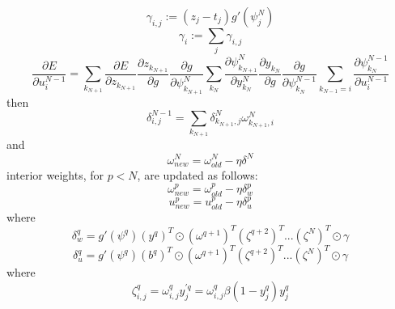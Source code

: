\documentclass{article}
\begin{document}
%
\begin{equation} \label{eq:gamma}
\gamma_{i,j} := (z_j - t_j) g'(\psi_j^N)
\end{equation}
%
\begin{equation} \label{eq:gamma_array}
\gamma_i := \sum_j \gamma_{i,j}
\end{equation}
%
\begin{equation} \label{eq:derive_du_nm1}
\frac{\partial E}{\partial u_i^{N-1}} =
\sum_{k_{N+1}} \frac{\partial E}{\partial z_{k_{N+1}}} \frac{\partial z_{k_{N+1}}}{\partial g} \frac{\partial g}{\partial \psi_{k_{N+1}}^N} \sum_{k_N} \frac{\partial \psi_{k_{N+1}}^N}{\partial y_{k_N}^N} \frac{\partial y_{k_{N}}}{\partial g} \frac{\partial g}{\partial \psi_{k_N}^{N-1}} \sum_{k_{N-1}=i} \frac{\partial \psi_{k_N}^{N-1}}{\partial u_i^{N-1}}
\end{equation}
%
then
%
\begin{equation} \label{eq:delta2}
\delta_{i,j}^{N-1} =
\sum_{k_{N+1}} \delta_{k_{N+1},j}^N \omega_{k_{N+1},i}^N
\end{equation}
%
and
%
\begin{equation} \label{eq:end_weights}
\omega_{new}^N = \omega_{old}^N - \eta \delta^N
\end{equation}
%
interior weights, for $p < N$, are updated as follows:
%
\begin{equation} \label{eq:w_weights}
\omega_{new}^p = \omega_{old}^p - \eta \delta_w^p
\end{equation}
%
\begin{equation} \label{eq:u_weights}
u_{new}^p = u_{old}^p - \eta \delta_u^p
\end{equation}
%
where
%
\begin{equation} \label{eq:w_delta}
\delta_w^{q} = g'(\psi^{q}) (y^{q})^T \odot (\omega^{q+1})^T (\zeta^{q+2})^T ... (\zeta^N)^T \odot \gamma
\end{equation}
%
\begin{equation} \label{eq:u_delta}
\delta_u^{q} = g'(\psi^{q}) (b^{q})^T \odot (\omega^{q+1})^T (\zeta^{q+2})^T ... (\zeta^N)^T \odot \gamma
\end{equation}
%
where
%
\begin{equation} \label{eq:u_delta}
\zeta_{i,j}^q = \omega_{i,j}^q y_j^{\prime q} = \omega_{i,j}^q \beta (1 - y_j^q) y_j^q
\end{equation}
%
\end{document}
